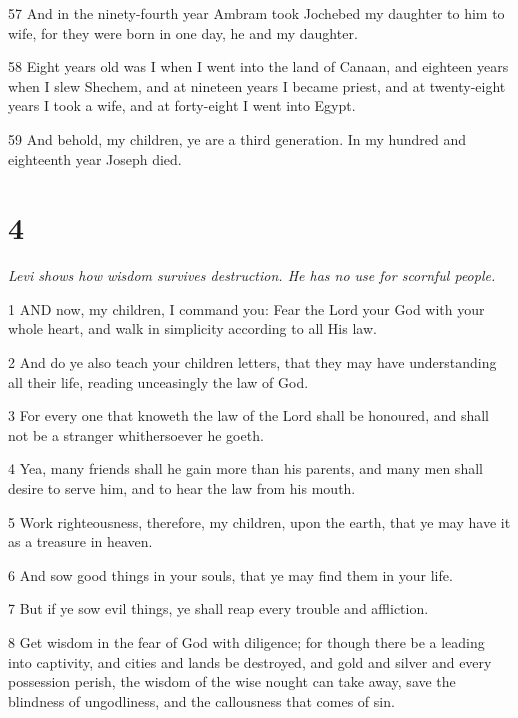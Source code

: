 \par 57 And in the ninety-fourth year Ambram took Jochebed my daughter to him to wife, for they were born in one day, he and my daughter.

\par 58 Eight years old was I when I went into the land of Canaan, and eighteen years when I slew Shechem, and at nineteen years I became priest, and at twenty-eight years I took a wife, and at forty-eight I went into Egypt.

\par 59 And behold, my children, ye are a third generation. In my hundred and eighteenth year Joseph died.

\chapter{4}

\par \textit{Levi shows how wisdom survives destruction. He has no use for scornful people.}

\par 1 AND now, my children, I command you: Fear the Lord your God with your whole heart, and walk in simplicity according to all His law.

\par 2 And do ye also teach your children letters, that they may have understanding all their life, reading unceasingly the law of God.

\par 3 For every one that knoweth the law of the Lord shall be honoured, and shall not be a stranger whithersoever he goeth.

\par 4 Yea, many friends shall he gain more than his parents, and many men shall desire to serve him, and to hear the law from his mouth.

\par 5 Work righteousness, therefore, my children, upon the earth, that ye may have it as a treasure in heaven.

\par 6 And sow good things in your souls, that ye may find them in your life.

\par 7 But if ye sow evil things, ye shall reap every trouble and affliction.

\par 8 Get wisdom in the fear of God with diligence; for though there be a leading into captivity, and cities and lands be destroyed, and gold and silver and every possession perish, the wisdom of the wise nought can take away, save the blindness of ungodliness, and the callousness that comes of sin.

